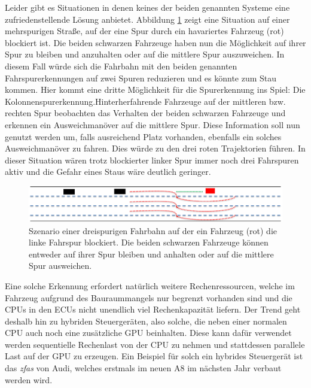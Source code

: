 Leider gibt es Situationen in denen keines der beiden genannten Systeme eine zufriedenstellende Lösung anbietet. Abbildung \ref{fig:crash} zeigt eine Situation auf einer mehrspurigen Straße, auf der eine Spur durch ein havariertes Fahrzeug (rot) blockiert ist. Die beiden schwarzen Fahrzeuge haben nun die Möglichkeit auf ihrer Spur zu bleiben und anzuhalten oder auf die mittlere Spur auszuweichen. In diesem Fall würde sich die Fahrbahn mit den beiden genannten Fahrspurerkennungen auf zwei Spuren reduzieren und es könnte zum Stau kommen.
Hier kommt eine dritte Möglichkeit für die Spurerkennung ins Spiel: Die Kolonnenspurerkennung.Hinterherfahrende Fahrzeuge auf der mittleren bzw. rechten Spur beobachten das Verhalten der beiden schwarzen Fahrzeuge und erkennen ein Ausweichmanöver auf die mittlere Spur. Diese Information soll nun genutzt werden um, falls ausreichend Platz vorhanden, ebenfalls ein solches Ausweichmanöver zu fahren. Dies würde zu den drei roten Trajektorien führen. In dieser Situation wären trotz blockierter linker Spur immer noch drei Fahrspuren aktiv und die Gefahr eines Staus wäre deutlich geringer.\\
\begin{figure}[t]\centering
  \includegraphics[width = 140mm]{bilder/Szenario_crash.png}
  \caption{Szenario einer dreispurigen Fahrbahn auf der ein Fahrzeug (rot) die linke Fahrspur blockiert. Die beiden schwarzen Fahrzeuge können entweder auf ihrer Spur bleiben und anhalten oder auf die mittlere Spur ausweichen.}\label{fig:crash}
\end{figure}
Eine solche Erkennung erfordert natürlich weitere Rechenressourcen, welche im Fahrzeug aufgrund des Bauraummangels nur begrenzt vorhanden sind und die CPUs in den ECUs nicht unendlich viel Rechenkapazität liefern. Der Trend geht deshalb hin zu hybriden Steuergeräten, also solche, die neben einer normalen CPU auch noch eine zusätzliche GPU beinhalten. Diese kann dafür verwendet werden sequentielle Rechenlast von der CPU zu nehmen und stattdessen parallele Last auf der GPU zu erzeugen. Ein Beispiel für solch ein hybrides Steuergerät ist das \textit{zfas}  \cite{zfas} von Audi, welches erstmals im neuen A8 im nächsten Jahr verbaut werden wird.

